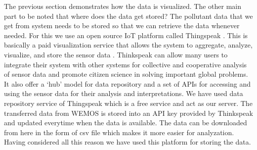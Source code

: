 The previous section demonstrates how the data is visualized. The other main part to be noted that where does the data get stored? The pollutant data that we get from system needs to be stored so that we can retrieve the data whenever needed. For this we use an open source IoT platform called Thingspeak \cite{thingspeak}. This is basically a paid visualization service that allows the system to aggregate, analyze, visualize, and store the sensor data \cite{thingspeak}. Thinkspeak can allow many users to integrate their system with other systems for collective and cooperative analysis of sensor data and promote citizen science in solving important global problems. It also offer a ‘hub’ model for data repository and a set of APIs for accessing and using the sensor data for their analysis and interpretations. We have used data repository service of Thingspeak which is a free service and act as our server. The transferred data from WEMOS is stored into an API key provided by Thinkspeak and updated everytime when the data is available. The data can be downloaded from here in the form of csv file which makes it more easier for analyzation. Having considered all this reason we have used this platform for storing the data.

